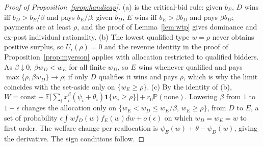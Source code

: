 \documentclass[12pt,a4paper]{article}
\theoremstyle{definition}
\theoremstyle{remark}
\newcommand{\E}{\mathbb{E}}
\renewcommand{\Pr}{\mathbb{P}}
\begin{document}
\begin{proof}[Proof of Proposition~\ref{prop:handicap}]
(a) is the critical-bid rule: given $b_E$, $D$ wins iff $b_D>b_E/\beta$ and pays $b_E/\beta$; given $b_D$, $E$ wins iff $b_E>\beta b_D$ and pays $\beta b_D$; payments are at least $\rho$, and the proof of Lemma~\ref{lem:wtp} gives dominance and ex-post individual rationality. (b) The lowest qualified type $w=\rho$ never obtains positive surplus, so $U_i(\rho)=0$ and the revenue identity in the proof of Proposition~\ref{prop:myerson} applies with allocation restricted to qualified bidders. As $\beta\downarrow0$, $\beta w_D<w_E$ for all finite $w_D$, so $E$ wins whenever qualified and pays $\max\{\rho,\beta w_D\}\to\rho$; if only $D$ qualifies it wins and pays $\rho$, which is why the limit coincides with the set-aside only on $\{w_E\ge\rho\}$. (c) By the identity of (b), $W=\mathrm{const}+\E\big[\sum_ix_i^\beta(\psi_i+\theta_i)\mathbf 1\{w_i\ge\rho\}\big]+r_0\Pr(\text{none})$. Lowering $\beta$ from $1$ to $1-\epsilon$ changes the allocation only on $\{w_E<w_D\le w_E/\beta,\,w_E\ge\rho\}$, from $D$ to $E$, a set of probability $\epsilon\int w f_D(w)f_E(w)dw+o(\epsilon)$ on which $w_D=w_E=w$ to first order. The welfare change per reallocation is $\psi_E(w)+\theta-\psi_D(w)$, giving the derivative. The sign conditions follow.
\end{proof}
\end{document}
